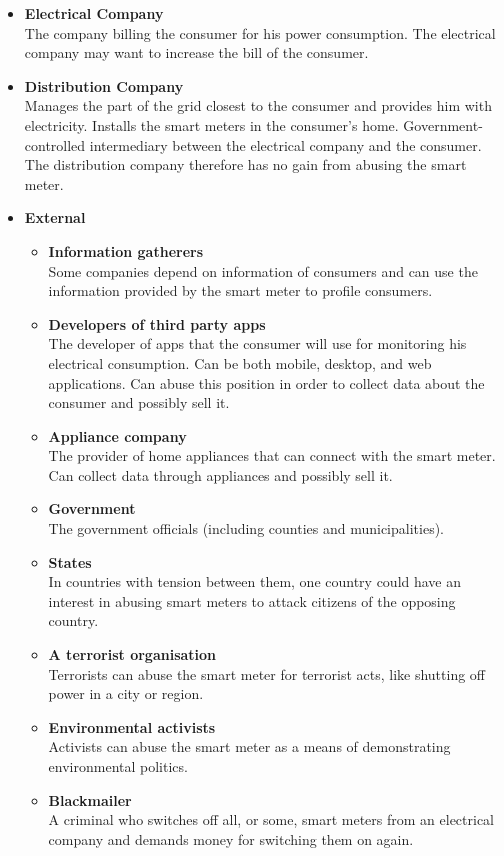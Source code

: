 \begin{itemize}
\item \textbf{Electrical Company}\\
The company billing the consumer for his power consumption.
The electrical company may want to increase the bill of the consumer.
\item \textbf{Distribution Company}\\
Manages the part of the grid closest to the consumer and provides him with electricity.
Installs the smart meters in the consumer's home.
Government-controlled intermediary between the electrical company and the consumer.
The distribution company therefore has no gain from abusing the smart meter.
\item \textbf{External}
\begin{itemize}
\item \textbf{Information gatherers}\\ 
Some companies depend on information of consumers and can use the information provided by the smart meter to profile consumers.
\item \textbf{Developers of third party apps}\\
The developer of apps that the consumer will use for monitoring his electrical consumption. 
Can be both mobile, desktop, and web applications.
Can abuse this position in order to collect data about the consumer and possibly sell it.
\item \textbf{Appliance company}\\ The provider of home appliances that can connect with the smart meter.
Can collect data through appliances and possibly sell it.
\item \textbf{Government}\\
The government officials (including counties and municipalities).
\item \textbf{States}\\ In countries with tension between them, one country could have an interest in abusing smart meters to attack citizens of the opposing country.
\item \textbf{A terrorist organisation}\\ Terrorists can abuse the smart meter for terrorist acts, like shutting off power in a city or region.
\item \textbf{Environmental activists}\\ Activists can abuse the smart meter as a means of demonstrating environmental politics.
\item \textbf{Blackmailer}\\ A criminal who switches off all, or some, smart meters from an electrical company and demands money for switching them on again.
\end{itemize}
\end{itemize}

